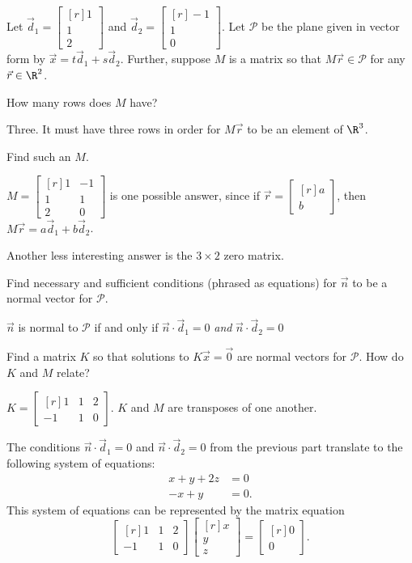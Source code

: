 \documentclass{problemset}
\newcommand{\mat}[1]{\begin{bmatrix*}[r]#1\end{bmatrix*}}
\begin{document}
	\question
	Let $\vec d_1=\mat{1\\1\\2}$ and $\vec d_2=\mat{-1\\1\\0}$. 
	Let $\mathcal P$ be the plane given in vector form by $\vec x=t\vec d_1+s\vec d_2$.
	Further, suppose $M$ is a matrix so that $M\vec r\in\mathcal P$ for any $\vec r\in\R^2$.
	\begin{parts}
		\item How many rows does $M$ have?
			\begin{solution}
				Three. It must have three rows in order for $M\vec r$ to be an
				element of $\R^3$. 
			\end{solution}
		\item Find such an $M$.
			\begin{solution}
				$M=\mat{1&-1\\1&1\\2&0}$ is one possible answer, since if
				$\vec r = \mat{a\\b}$, then $M \vec r = a \vec d_1 + b \vec d_2$. 

				Another less interesting answer is the $3\times2$ zero matrix. 
			\end{solution}
		\item Find necessary and sufficient conditions (phrased as equations) for 
			$\vec n$ to be a normal vector for $\mathcal P$.
			\begin{solution}
				$\vec n$ is normal to $\mathcal P$ if and only if 
				$\vec n\cdot\vec d_1=0$ \emph{and} $\vec n\cdot\vec d_2=0$
			\end{solution}
		\item Find a matrix $K$ so that solutions to $K\vec x=\vec 0$ are normal
			vectors for $\mathcal P$. How do $K$ and $M$ relate?
			\begin{solution}
				$K = \mat{1&1&2\\-1&1&0}$. $K$ and $M$ are transposes of 
				one another.

				The conditions $\vec n\cdot\vec d_1=0$ and $\vec n\cdot\vec d_2=0$
				from the previous part translate to the following system of equations:
				\begin{align*}
					x + y + 2z &= 0 \\
					-x + y &= 0.
				\end{align*}
				This system of equations can be represented by the matrix equation 
				\[
					\mat{1&1&2\\-1&1&0}\mat{x\\y\\z} = \mat{0\\0}.
				\]
			\end{solution}
	\end{parts}
\end{document}
